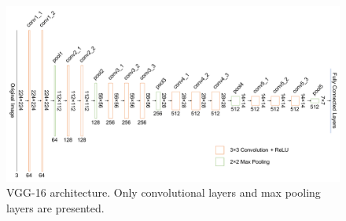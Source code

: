 \begin{figure}[!h]
	\centering
	\includegraphics[width=\fig\textwidth]{3-01.pdf}
    \caption[VGG-16 architecture]{VGG-16 architecture. Only convolutional layers and max pooling layers are presented.}
    \label{fig:vgg16}
\end{figure}